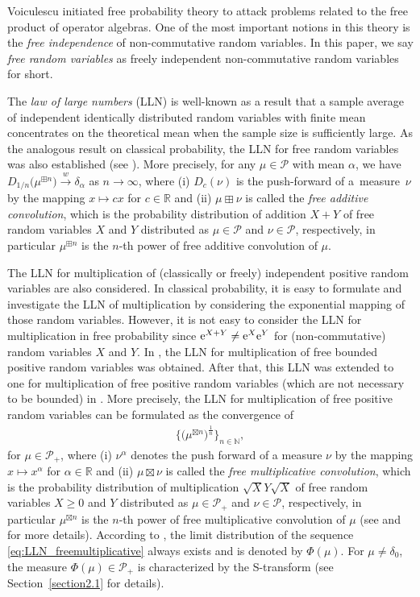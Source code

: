 \documentclass[pdftex]{sigma}
\numberwithin{equation}{section}
\newcommand{\calP}{\mathcal{P}}
\begin{document}
Voiculescu initiated free probability theory to attack problems related to the free product of operator algebras.
One of the most important notions in this theory is the {\it free independence} of non-commutative random variables.
In this paper, we say \textit{free random variables} as freely independent non-commutative random variables for short.

The {\it law of large numbers} (LLN) is well-known as a result that a sample average of independent identically distributed random variables with finite mean concentrates on the theoretical mean when the sample size is sufficiently large.
As the analogous result on classical probability, the LLN for free random variables was also established (see \cite{LP97}).
More precisely, for any $\mu\in\calP$ with mean $\alpha$, we have $D_{1/n}\big(\mu^{\boxplus n}\big)\xrightarrow{w}\delta_\alpha$ as $n\rightarrow\infty$, where (i) $D_{c}(\nu)$ is the push-forward of a~measure~$\nu$ by the mapping $x\mapsto cx$ for $c\in \mathbb{R}$ and (ii) $\mu\boxplus\nu$ is called the {\it free additive convolution}, which is the probability distribution of addition $X+Y$ of free random variables $X$ and $Y$ distributed as $\mu\in \calP$ and $\nu\in \calP$, respectively, in particular $\mu^{\boxplus n}$ is the $n$-th power of free additive convolution of $\mu$.

The LLN for multiplication of (classically or freely) independent positive random variables are also considered.
In classical probability, it is easy to formulate and investigate the LLN of multiplication by considering the exponential mapping of those random variables.
However, it is not easy to consider the LLN for multiplication in free probability since ${\rm e}^{X+Y} \neq {\rm e}^X {\rm e}^Y$ for (non-commutative) random variables $X$ and $Y$. In \cite{Tucci10}, the LLN for multiplication of free bounded positive random variables was obtained. After that, this LLN was extended to one for multiplication of free positive random variables (which are not necessary to be bounded) in \cite{HM13}. More precisely, the LLN for multiplication of free positive random variables can be formulated as the convergence of
\begin{align}\label{eq:LLN_freemultiplicative}
\Big\{ \big(\mu^{\boxtimes n}\big)^{\frac{1}{n}}  \Big\}_{n\in \mathbb{N}},
\end{align}
for $\mu \in \calP_+$, where (i) $\nu^\alpha$ denotes the push forward of a measure $\nu$ by the mapping $x\mapsto x^\alpha$ for $\alpha\in\mathbb{R}$ and (ii) $\mu\boxtimes\nu$ is called the {\it free multiplicative convolution}, which is the probability distribution of multiplication $\sqrt{X}Y\sqrt{X}$ of free random variables $X\ge 0$ and $Y$ distributed as $\mu \in \calP_+$ and $\nu \in \calP$, respectively,  in particular $\mu^{\boxtimes n}$ is the $n$-th power of free multiplicative convolution of $\mu$ (see \cite{Voi87} and \cite{BV93} for more details).
According to \cite{HM13}, the limit distribution of the sequence \eqref{eq:LLN_freemultiplicative} always exists and is denoted by $\Phi(\mu)$. For $\mu\neq \delta_0$, the measure $\Phi(\mu) \in \calP_+$ is characterized by the S-transform (see Section~\ref{section2.1} for details).
\end{document}
